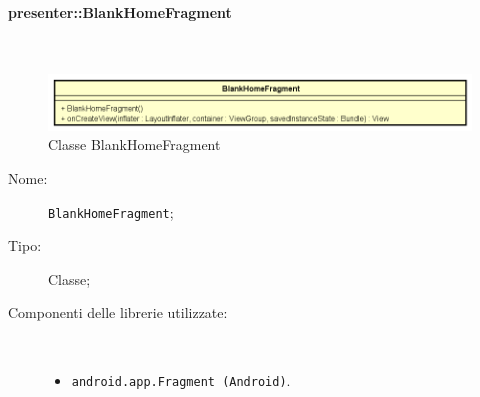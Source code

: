 \documentclass[../DefinizioneDiProdotto.tex]{subfiles}
\begin{document}
\paragraph{presenter::BlankHomeFragment}
\
\begin{figure}[H]
	\centering
	\includegraphics[width=\maxwidth]{img/BlankHomeFragment.png}
	\caption{Classe BlankHomeFragment}\label{fig:presenter::BlankHomeFragment} 
\end{figure}
\begin{description}
	\item[Nome:] \texttt{BlankHomeFragment};
	\item[Tipo:] Classe;
	\item[Componenti delle librerie utilizzate:] \
	\begin{itemize}
		\item \texttt{android.app.Fragment (Android)}.
		

\end{itemize}
\end{description}
\end{document}
